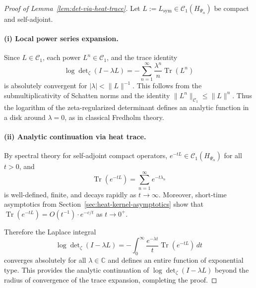 \begin{proof}[Proof of Lemma~\ref{lem:det-via-heat-trace}]
Let \( L := L_{\mathrm{sym}} \in \mathcal{C}_1(H_{\Psi_\alpha}) \) be compact and self-adjoint.

\paragraph{(i) Local power series expansion.}
Since \( L \in \mathcal{C}_1 \), each power \( L^n \in \mathcal{C}_1 \), and the trace identity
\[
\log \det\nolimits_\zeta(I - \lambda L) = - \sum_{n=1}^\infty \frac{\lambda^n}{n} \operatorname{Tr}(L^n)
\]
is absolutely convergent for \( |\lambda| < \|L\|^{-1} \). This follows from the submultiplicativity of Schatten norms and the identity \( \|L^n\|_{\mathcal{C}_1} \le \|L\|^n \). Thus the logarithm of the zeta-regularized determinant defines an analytic function in a disk around \( \lambda = 0 \), as in classical Fredholm theory.

\paragraph{(ii) Analytic continuation via heat trace.}
By spectral theory for self-adjoint compact operators, \( e^{-tL} \in \mathcal{C}_1(H_{\Psi_\alpha}) \) for all \( t > 0 \), and
\[
\operatorname{Tr}(e^{-tL}) = \sum_{n=1}^\infty e^{-t\lambda_n}
\]
is well-defined, finite, and decays rapidly as \( t \to \infty \). Moreover, short-time asymptotics from Section~\ref{sec:heat-kernel-asymptotics} show that \( \operatorname{Tr}(e^{-tL}) = O(t^{-1}) \cdot e^{-c/t} \) as \( t \to 0^+ \).

\medskip
\noindent
Therefore the Laplace integral
\[
\log \det\nolimits_\zeta(I - \lambda L)
= - \int_0^\infty \frac{e^{-\lambda t}}{t} \operatorname{Tr}(e^{-tL})\, dt
\]
converges absolutely for all \( \lambda \in \mathbb{C} \) and defines an entire function of exponential type. This provides the analytic continuation of \( \log \det_\zeta(I - \lambda L) \) beyond the radius of convergence of the trace expansion, completing the proof.
\end{proof}
%  